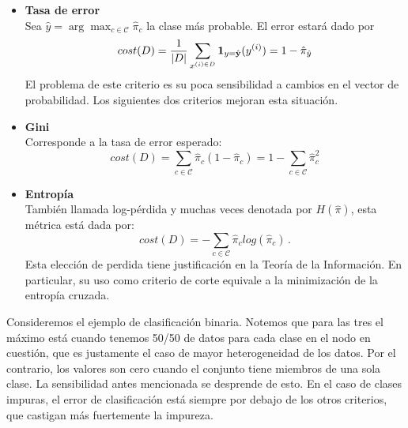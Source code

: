 \begin{itemize}
    \item \textbf{Tasa de error} \\
    Sea $\hat y = \arg\max_{c \in \mathcal{C}} \hat \pi_c$ la clase más probable. El error estará dado por
    \begin{equation}
        cost(D) = \frac{1}{|D|} \sum_{x^{(i) \in D}} \mathbf{1}_{y = \hat {\mathbf{y}}}(y^{(i)}) = 1 - \hat \pi_{\hat y}
    \end{equation}
    El problema de este criterio es su poca sensibilidad a cambios en el vector de probabilidad. Los siguientes dos criterios mejoran esta situación.

    \item \textbf{Gini} \\
    Corresponde a la tasa de error esperado:
    \begin{equation}
        cost(D) = \sum_{c \in \mathcal{C}} \hat \pi_c (1 - \hat \pi_c) = 1 - \sum_{c \in \mathcal{C}} \hat \pi_c^2
    \end{equation}

    \item \textbf{Entropía} \\
    También llamada log-pérdida y muchas veces denotada por $H(\hat \pi)$, esta métrica está dada por:
    \begin{equation}
        cost(D) = - \sum_{c \in \mathcal{C}} \hat \pi_c log(\hat \pi_c) \,.
    \end{equation}
    Esta elección de perdida tiene justificación en la Teoría de la Información. En particular, su uso como criterio de corte equivale a la minimización de la entropía cruzada.
\end{itemize}

Consideremos el ejemplo de clasificación binaria.  %
Notemos que para las tres el máximo está cuando tenemos 50/50 de datos para cada clase en el nodo en cuestión, que es justamente el caso de mayor heterogeneidad de los datos. Por el contrario, los valores son cero cuando el conjunto tiene miembros de una sola clase. La sensibilidad antes mencionada se desprende de esto. En el caso de clases impuras, el error de clasificación está siempre por debajo de los otros criterios, que castigan más fuertemente la impureza.



